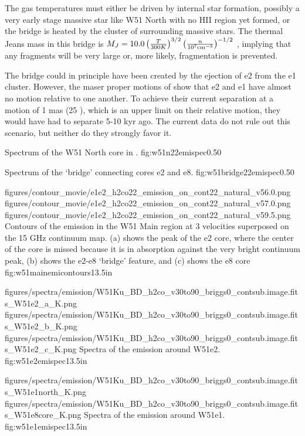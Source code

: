 The gas temperatures must either be driven by internal star formation, possibly
a very early stage massive star like W51 North with no HII region yet formed,
or the bridge is heated by the cluster of surrounding massive stars.  The
thermal Jeans mass in this bridge is $M_J = 10.0 \left(\frac{T}{300
K}\right)^{3/2} \left(\frac{n}{10^7 \textrm{cm}^{-3}}\right)^{-1/2}$ \msun, implying that
any fragments will be very large or, more likely, fragmentation is prevented.

The bridge could in principle have been created by the ejection of e2 from the
e1 cluster.  However, the maser proper motions of \citep{Saito2014a} show that
e2 and e1 have almost no motion relative to one another.  To achieve their
current separation at a motion of 1 mas \peryr (25 \kms), which is an upper
limit on their relative motion, they would have had to separate 5-10 kyr ago.
The current data do not rule out this scenario, but neither do they strongly
favor it.

{Spectrum of the W51 North core in \ortho \twotwo.}
{fig:w51n22emispec}{0.5}{0}

{Spectrum of the `bridge' connecting cores e2 and e8.}
{fig:w51bridge22emispec}{0.5}{0}

\FigureThreeAA
{figures/contour_movie/e1e2_h2co22_emission_on_cont22_natural_v56.0.png}
{figures/contour_movie/e1e2_h2co22_emission_on_cont22_natural_v57.0.png}
{figures/contour_movie/e1e2_h2co22_emission_on_cont22_natural_v59.5.png}
{Contours of the \formaldehyde \twotwo emission in the W51 Main region at 3
velocities superposed on the 15 GHz continuum map.  (a) shows the peak of the e2
core, where the center of the core is missed because it is in absorption
against the very bright continuum peak, (b) shows the e2-e8 `bridge' feature,
and (c) shows the e8 core}
{fig:w51mainemicontours}{1}{3.5in}

\FigureThreeAA
{figures/spectra/emission/W51Ku_BD_h2co_v30to90_briggs0_contsub.image.fits_W51e2_a_K.png}
{figures/spectra/emission/W51Ku_BD_h2co_v30to90_briggs0_contsub.image.fits_W51e2_b_K.png}
{figures/spectra/emission/W51Ku_BD_h2co_v30to90_briggs0_contsub.image.fits_W51e2_c_K.png}
{Spectra of the \twotwo emission around W51e2.}
{fig:w51e2emispec}{1}{3.5in}

\FigureTwoAA
{figures/spectra/emission/W51Ku_BD_h2co_v30to90_briggs0_contsub.image.fits_W51e1north_K.png}
{figures/spectra/emission/W51Ku_BD_h2co_v30to90_briggs0_contsub.image.fits_W51e8core_K.png}
{Spectra of the \twotwo emission around W51e1.}
{fig:w51e1emispec}{1}{3.5in}

